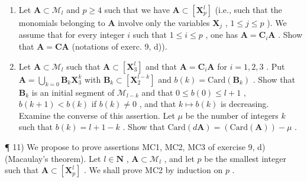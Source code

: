 \begin{enumerate}
\def\labelenumi{\alph{enumi})}
\setcounter{enumi}{1}
\item
  Let \(\mathbf{A} \subset \mathcal{M}_l\) and \(p \geqslant 4\) such that we have \(\mathbf{A} \subset [\mathbf{X}_p^l]\) (i.e., such that the monomials belonging to \(\mathbf{A}\) involve only the variables \(\mathbf{X}_j\) , \(1 \leqslant j \leqslant p\) ). We assume that for every integer \(i\) such that \(1 \leqslant i \leqslant p\) , one has \(\mathbf{A} = \mathbf{C}_i\mathbf{A}\) . Show that \(\mathbf{A} = \mathbf{CA}\) (notations of exerc. 9, d)).
\item
  Let \(\mathbf{A} \subset \mathcal{M}_l\) such that \(\mathbf{A} \subset [\mathbf{X}_3^l]\) and that \(\mathbf{A} = \mathbf{C}_i\mathbf{A}\) for \(i = 1, 2, 3\) . Put \(\mathbf{A} = \bigcup_{k=0} \mathbf{B}_k\mathbf{X}_3^{k}\) with \(\mathbf{B}_k \subset [\mathbf{X}_2^{l-k}]\) and \(b(k) = \text{Card}(\mathbf{B}_k)\) . Show that \(\mathbf{B}_k\) is an initial segment of \(\mathcal{M}_{l-k}\) and that \(0 \leqslant b(0) \leqslant l + 1\) , \(b(k+1) < b(k)\) if \(b(k) \neq 0\) , and that \(k \mapsto b(k)\) is decreasing. Examine the converse of this assertion. Let \(\mu\) be the number of integers \(k\) such that \(b(k) = l + 1 - k\) . Show that \(\text{Card}(d\mathbf{A}) = (\text{Card}(\mathbf{A})) - \mu\) .
\end{enumerate}

¶ 11) We propose to prove assertions MC1, MC2, MC3 of exercise 9, d) (Macaulay's theorem). Let \(l \in \mathbf{N}\) , \(\mathbf{A} \subset \mathcal{M}_l\) , and let \(p\) be the smallest integer such that \(\mathbf{A} \subset [\mathbf{X}_p^l]\) . We shall prove MC2 by induction on \(p\) .

